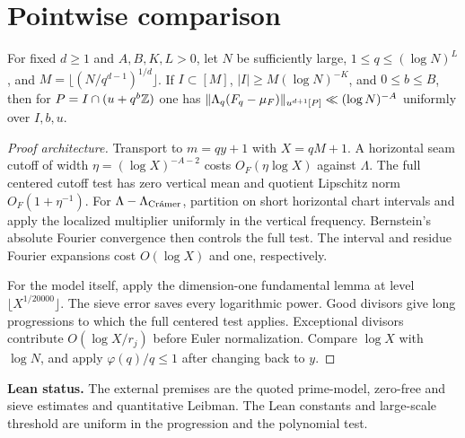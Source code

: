 \section{Pointwise comparison}

\begin{proposition}\label{p:prime-phase}
\leanok
{}
For fixed $d\ge1$ and $A,B,K,L>0$, let $N$ be sufficiently large,
$1\le q\le(\log N)^L$, and $M=\lfloor(N/q^{d-1})^{1/d}\rfloor$.
If $I\subset[M]$, $|I|\ge M(\log N)^{-K}$, and $0\le b\le B$,
then for $P=I\cap(u+q^b\mathbb Z)$ one has
$\lVert\Lambda_q(F_q-\mu_F)\rVert_{u^{d+1}[P]}\ll(\log N)^{-A}$
uniformly over $I,b,u$.
\end{proposition}
\begin{proof}[Proof architecture]
\leanok
Transport to $m=qy+1$ with $X=qM+1$. A horizontal seam cutoff of
width $\eta=(\log X)^{-A-2}$ costs $O_F(\eta\log X)$ against $\Lambda$.
The full centered cutoff test has zero vertical mean and quotient
Lipschitz norm $O_F(1+\eta^{-1})$. For $\Lambda-\Lambda_{\textup{Cr\'amer}}$,
partition on short horizontal chart intervals and apply the
localized multiplier uniformly in the vertical frequency.
Bernstein's absolute Fourier convergence then controls the full
test. The interval and residue Fourier expansions cost
$O(\log X)$ and one, respectively.

For the model itself, apply the dimension-one fundamental lemma
at level $\lfloor X^{1/20000}\rfloor$. The sieve error saves every
logarithmic power. Good divisors give long progressions to which
the full centered test applies. Exceptional divisors contribute
$O(\log X/r_j)$ before Euler normalization. Compare $\log X$
with $\log N$, and apply $\varphi(q)/q\le1$ after changing
back to $y$.
\end{proof}
\noindent\textbf{Lean status.} The external premises are the quoted
prime-model, zero-free and sieve estimates and quantitative Leibman.
The Lean constants and large-scale threshold are uniform in the
progression and the polynomial test.


